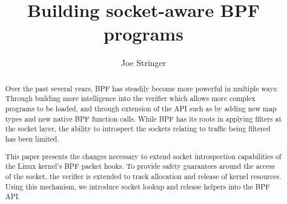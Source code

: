 \documentclass[10pt,sigconf,authorversion]{lpc}
\title{Building socket-aware BPF programs}
\author{Joe Stringer}
\affiliation{%
      \institution{Cilium.io}}
\begin{document}
\begin{abstract}

    Over the past several years, BPF has steadily become more powerful in
    multiple ways: Through building more intelligence into the verifier which
    allows more complex programs to be loaded, and through extension of the API
    such as by adding new map types and new native BPF function calls. While
    BPF has its roots in applying filters at the socket layer, the ability to
    introspect the sockets relating to traffic being filtered has been limited.

    This paper presents the changes necessary to extend socket introspection
    capabilities of the Linux kernel's BPF packet hooks. To provide safety
    guarantees around the access of the socket, the verifier is extended to
    track allocation and release of kernel resources. Using this mechanism, we
    introduce socket lookup and release helpers into the BPF API.





\end{abstract}

\maketitle
\end{document}
